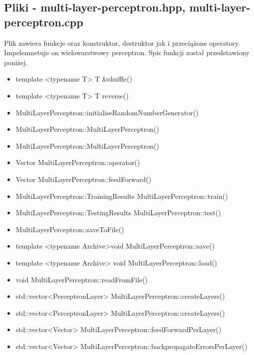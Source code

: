 \documentclass{classrep}
\begin{document}
{        \subsection{Pliki - multi-layer-perceptron.hpp, multi-layer-perceptron.cpp}
        {
            Plik zawiera funkcje oraz konstruktor, destruktor jak i przeciążone operatory.
            Impelemnetuje on wielowarstwowy perceptron.
            Spis funkcji został przedstawiony poniżej.
            \begin{itemize}
                \item template <typename T> T \&shuffle()
                \item template <typename T> T reverse()
                \item MultiLayerPerceptron::initialiseRandomNumberGenerator()
                \item MultiLayerPerceptron::MultiLayerPerceptron()
                \item MultiLayerPerceptron::MultiLayerPerceptron()
                \item Vector MultiLayerPerceptron::operator()
                \item Vector MultiLayerPerceptron::feedForward()
                \item MultiLayerPerceptron::TrainingResults MultiLayerPerceptron::train()
                \item MultiLayerPerceptron::TestingResults MultiLayerPerceptron::test()
                \item MultiLayerPerceptron::saveToFile()
                \item template <typename Archive>void MultiLayerPerceptron::save()
                \item template <typename Archive> void MultiLayerPerceptron::load()
                \item void MultiLayerPerceptron::readFromFile()
                \item std::vector<PerceptronLayer> MultiLayerPerceptron::createLayers()
                \item std::vector<PerceptronLayer> MultiLayerPerceptron::createLayers()
                \item std::vector<Vector> MultiLayerPerceptron::feedForwardPerLayer()
                \item std::vector<Vector> MultiLayerPerceptron::backpropagateErrorsPerLayer()
            \end{itemize}
        }

}
\end{document}
